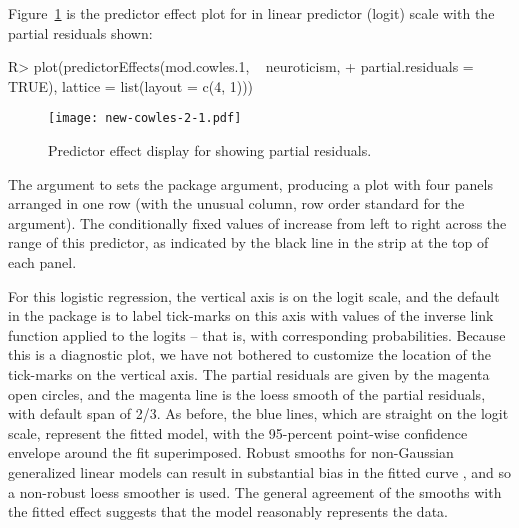 \documentclass[article]{jss}
\begin{document}
Figure~\ref{new-cowles-2} is the predictor effect plot for  in linear predictor (logit) scale with the partial residuals shown:
%
\begin{Schunk}
\begin{Sinput}
R> plot(predictorEffects(mod.cowles.1, ~ neuroticism, 
+    partial.residuals = TRUE), lattice = list(layout = c(4, 1)))
\end{Sinput}
\end{Schunk}
%
\begin{figure}[t!]
  \centering
    \texttt{[image: new-cowles-2-1.pdf]}
  \caption{Predictor effect display for  showing partial residuals.}\label{new-cowles-2}
\end{figure}
The  argument to  sets the  package  argument, producing a plot with four panels arranged in one row (with the unusual column, row order standard for the   argument). The conditionally fixed values of  increase from left to right across the range of this predictor, as indicated by the black line in the strip at the top of each panel.

For this logistic regression, the vertical axis is on the logit scale,
and the default in the  package is to label tick-marks on
this axis with values of the inverse link function applied to the
logits -- that is, with corresponding probabilities. Because this is a
diagnostic plot, we have not bothered to customize the location of the
tick-marks on the vertical axis. The partial residuals are given by
the magenta open circles, and the magenta line is the loess smooth of
the partial residuals, with default span of 2/3. As before, the blue
lines, which are straight on the logit scale, represent the fitted
model, with the 95-percent point-wise confidence envelope around the
fit superimposed.  Robust smooths for non-Gaussian generalized linear
models can result in substantial bias in the fitted curve
\citep{LandwehrPregibonShoemaker80}, and so a non-robust loess
smoother is used. The general agreement of the smooths with the fitted
effect suggests that the model reasonably represents the data.
\end{document}
